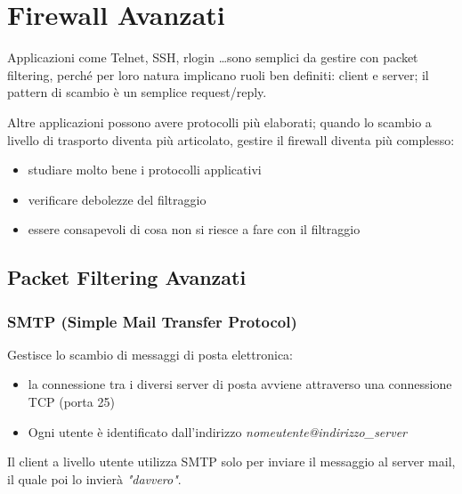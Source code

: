 \chapter{Firewall Avanzati}

Applicazioni come Telnet, SSH, rlogin \dots sono semplici da gestire con 
packet filtering, perché per loro natura implicano ruoli ben definiti: client 
e server; il pattern di scambio è un semplice request/reply.

Altre applicazioni possono avere protocolli più elaborati; quando lo 
scambio a livello di trasporto diventa più articolato, gestire il firewall 
diventa più complesso:
\begin{itemize}
    \item studiare molto bene i protocolli applicativi 
    \item verificare debolezze del filtraggio 
    \item essere consapevoli di cosa non si riesce a fare con il filtraggio 
\end{itemize}

\section{Packet Filtering Avanzati}

\subsection{SMTP (Simple Mail Transfer Protocol)}
Gestisce lo scambio di messaggi di posta elettronica:
\begin{itemize}
    \item la connessione tra i diversi server di posta avviene attraverso una connessione 
    TCP (porta 25)
    \item Ogni utente è identificato dall'indirizzo \textit{nomeutente@indirizzo\_server}
\end{itemize}

\noindent Il client a livello utente utilizza SMTP solo per inviare il messaggio al 
server mail, il quale poi lo invierà \textit{"davvero"}.

